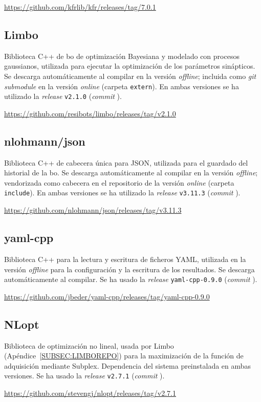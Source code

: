 \url{https://github.com/kfrlib/kfr/releases/tag/7.0.1}


\subsection{Limbo\label{SUBSEC:LIMBOREPO}}

Biblioteca C++ de \ac{bo} de optimización Bayesiana y modelado con procesos gaussianos, utilizada para ejecutar la optimización de los parámetros sinápticos. Se descarga automáticamente al compilar en la versión \textit{offline}; incluida como \textit{git submodule} en la versión \textit{online} (carpeta \texttt{extern}). En ambas versiones se ha utilizado la \textit{release} \texttt{v2.1.0} (\textit{commit} \texttt{}).

\url{https://github.com/resibots/limbo/releases/tag/v2.1.0}


\subsection{nlohmann/json\label{SUBSEC:JSONREPO}}

Biblioteca C++ de cabecera única para JSON, utilizada para el guardado del historial de la \ac{bo}. Se descarga automáticamente al compilar en la versión \textit{offline}; vendorizada como cabecera en el repositorio de la versión \textit{online} (carpeta \texttt{include}). En ambas versiones se ha utilizado la \textit{release} \texttt{v3.11.3} (\textit{commit} \texttt{}).

\url{https://github.com/nlohmann/json/releases/tag/v3.11.3}


\subsection{yaml-cpp\label{SUBSEC:YAMLCPPREPO}}

Biblioteca C++ para la lectura y escritura de ficheros YAML, utilizada en la versión \textit{offline} para la configuración y la escritura de los resultados. Se descarga automáticamente al compilar. Se ha usado la \textit{release} \texttt{yaml-cpp-0.9.0} (\textit{commit} \texttt{}).

\url{https://github.com/jbeder/yaml-cpp/releases/tag/yaml-cpp-0.9.0}


\subsection{NLopt\label{SUBSEC:NLOPTREPO}}

Biblioteca de optimización no lineal, usada por Limbo (Apéndice~\ref{SUBSEC:LIMBOREPO}) para la maximización de la función de adquisición mediante Subplex. Dependencia del sistema preinstalada en ambas versiones. Se ha usado la \textit{release} \texttt{v2.7.1} (\textit{commit} \texttt{}).

\url{https://github.com/stevengj/nlopt/releases/tag/v2.7.1}


